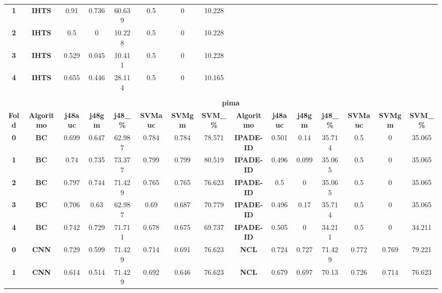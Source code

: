{{\begin{tabular}{c|c|cccccc|ccccccc}
\textbf{1} & \textbf{IHTS} & 0.91  & 0.736 & 60.639 & 0.5   & 0     & 10.228 &       &       &       &       &       &       &  \\
\textbf{2} & \textbf{IHTS} & 0.5   & 0     & 10.228 & 0.5   & 0     & 10.228 &       &       &       &       &       &       &  \\
\textbf{3} & \textbf{IHTS} & 0.529 & 0.045 & 10.411 & 0.5   & 0     & 10.228 &       &       &       &       &       &       &  \\
\textbf{4} & \textbf{IHTS} & 0.655 & 0.446 & 28.114 & 0.5   & 0     & 10.165 &       &       &       &       &       &       &  \\
\multicolumn{1}{c}{} & \multicolumn{1}{c}{} &       &       &       &       &       & \multicolumn{1}{c}{} &       &       &       &       &       &       &  \\
\multicolumn{1}{c}{} & \multicolumn{14}{c}{\textbf{pima}} \\
\midrule
\textbf{Fold} & \textbf{Algoritmo} & \textbf{j48auc} & \textbf{j48gm} & \textbf{j48\_\%} & \textbf{SVMauc} & \textbf{SVMgm} & \textbf{SVM\_\%} & \multicolumn{1}{c|}{\textbf{Algoritmo}} & \textbf{j48auc} & \textbf{j48gm} & \textbf{j48\_\%} & \textbf{SVMauc} & \textbf{SVMgm} & \textbf{SVM\_\%} \\
\midrule
\textbf{0} & \textbf{BC} & 0.699 & 0.647 & 62.987 & 0.784 & 0.784 & 78.571 & \multicolumn{1}{c|}{\textbf{IPADE-ID}} & 0.501 & 0.14  & 35.714 & 0.5   & 0     & 35.065 \\
\textbf{1} & \textbf{BC} & 0.74  & 0.735 & 73.377 & 0.799 & 0.799 & 80.519 & \multicolumn{1}{c|}{\textbf{IPADE-ID}} & 0.496 & 0.099 & 35.065 & 0.5   & 0     & 35.065 \\
\textbf{2} & \textbf{BC} & 0.797 & 0.744 & 71.429 & 0.765 & 0.765 & 76.623 & \multicolumn{1}{c|}{\textbf{IPADE-ID}} & 0.5   & 0     & 35.065 & 0.5   & 0     & 35.065 \\
\textbf{3} & \textbf{BC} & 0.706 & 0.63  & 62.987 & 0.69  & 0.687 & 70.779 & \multicolumn{1}{c|}{\textbf{IPADE-ID}} & 0.496 & 0.17  & 35.714 & 0.5   & 0     & 35.065 \\
\textbf{4} & \textbf{BC} & 0.742 & 0.729 & 71.711 & 0.678 & 0.675 & 69.737 & \multicolumn{1}{c|}{\textbf{IPADE-ID}} & 0.505 & 0     & 34.211 & 0.5   & 0     & 34.211 \\
\textbf{0} & \textbf{CNN} & 0.729 & 0.599 & 71.429 & 0.714 & 0.691 & 76.623 & \multicolumn{1}{c|}{\textbf{NCL}} & 0.724 & 0.727 & 71.429 & 0.772 & 0.769 & 79.221 \\
\textbf{1} & \textbf{CNN} & 0.614 & 0.514 & 71.429 & 0.692 & 0.646 & 76.623 & \multicolumn{1}{c|}{\textbf{NCL}} & 0.679 & 0.697 & 70.13 & 0.726 & 0.714 & 76.623 \\

\end{tabular}}}
